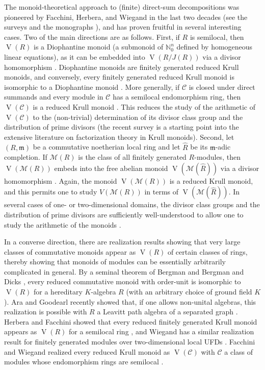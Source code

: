 \documentclass[a4paper,11pt,oneside]{amsart}
\theoremstyle{remark}
\newcommand{\bN}{\mathbb N}
\newcommand{\cC}{\mathcal C}
\DeclareMathOperator{\Vmon}{V}
\begin{document}
The monoid-theoretical approach to (finite) direct-sum decompositions was pioneered by Facchini, Herbera, and Wiegand in the last two decades (see the surveys \cite{Facchini06,BaethWiegand13} and the monographs \cite{LeuschkeWiegand12,Facchini19}), and has proven fruitful in several interesting cases.
Two of the main directions are as follows.
First, if $R$ is semilocal, then $\Vmon(R)$ is a Diophantine monoid (a submonoid of $\bN_0^n$ defined by homogeneous linear equations), as it can be embedded into $\Vmon(R/J(R))$ via a divisor homomorphism \cite{FacchiniHerbera00,FacchiniHerbera00a}.
Diophantine monoids are finitely generated reduced Krull monoids, and conversely, every finitely generated reduced Krull monoid is isomorphic to a Diophantine monoid \cite{ChapmanKrauseOeljeklaus02}.
More generally, if $\cC$ is closed under direct summands and every module in $\cC$ has a semilocal endomorphism ring, then $\Vmon(\cC)$ is a reduced Krull monoid \cite{Facchini02}.
This reduces the study of the arithmetic of $\Vmon(\cC)$ to the (non-trivial) determination of its divisor class group and the distribution of prime divisors (the recent survey \cite{GeroldingerZhong20} is a starting point into the extensive literature on factorization theory in Krull monoids).
Second, let $(R,\mathfrak m)$ be a commutative noetherian local ring and let $\widehat R$ be its $\mathfrak m$-adic completion.
If $\mathcal M(R)$ is the class of all finitely generated $R$-modules, then $\Vmon(\mathcal M(R))$ embeds into the free abelian monoid $\Vmon(\mathcal M(\widehat R))$ via a divisor homomorphism \cite{Wiegand01}.
Again, the monoid $\Vmon(\mathcal M(R))$ is a reduced Krull monoid, and this permits one to study $V(\mathcal M(R))$ in terms of $\Vmon(\mathcal M(\widehat R))$.
In several cases of one- or two-dimensional domains, the divisor class groups and the distribution of prime divisors are sufficiently well-understood to allow one to study the arithmetic of the monoids \cite{Baeth09,BaethGeroldinger14,BaethLuckas11,BaethGeroldingerGrynkiewiczSmertnig15,Grynkiewicz22}.

In a converse direction, there are realization results showing that very large classes of commutative monoids appear as $\Vmon(R)$ of certain classes of rings, thereby showing that monoids of modules can be essentially arbitrarily complicated in general.
By a seminal theorem of Bergman \cite{Bergman} and Bergman and Dicks \cite{BergWar}, every reduced commutative monoid with order-unit is isomorphic to $\Vmon(R)$ for a hereditary $K$-algebra $R$ (with an arbitrary choice of ground field $K$).
Ara and Goodearl recently showed that, if one allows non-unital algebras, this realization is possible with $R$ a Leavitt path algebra of a separated graph \cite{AraGoodearl12}.
Herbera and Facchini showed that every reduced finitely generated Krull monoid appears as $\Vmon(R)$ for a semilocal ring \cite{FacchiniHerbera00a}, and Wiegand has a similar realization result for finitely generated modules over two-dimensional local UFDs \cite{Wiegand01}.
Facchini and Wiegand realized every reduced Krull monoid as $\Vmon(\cC)$ with $\cC$ a class of modules whose endomorphism rings are semilocal \cite{FacchiniWiegand04}.
\end{document}
